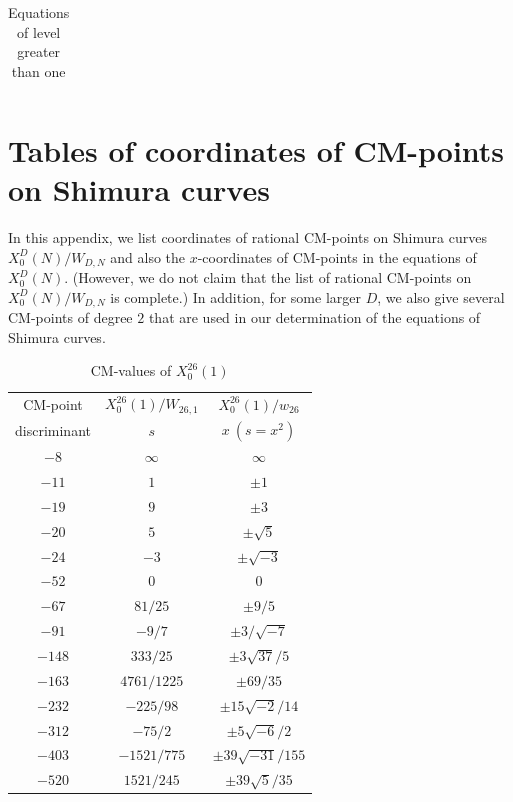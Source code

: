\documentclass{amsart}
\theoremstyle{definition}
\begin{document}
\begin{appendices}
\begin{table}[htb]
\begin{tabular}{|c|c|c|}
\end{tabular} 
\bigskip
\caption{Equations of level greater than one}
\end{table}

\section{Tables of coordinates of CM-points on Shimura curves}
In this appendix, we list coordinates of rational CM-points on Shimura
curves $X_0^D(N)/W_{D,N}$ and also the $x$-coordinates of CM-points in
the equations of $X_0^D(N)$. (However, we do not claim that the list
of rational CM-points on $X_0^D(N)/W_{D,N}$ is complete.) In addition,
for some larger $D$, we also give several CM-points of degree $2$ that
are used in our determination of the equations of Shimura curves.

\renewcommand{\arraystretch}{1.5}
\tabcolsep=10pt                         
\begin{table}[H]
\begin{tabular}{|c|c|c|}
\hline
CM-point& ${X_{0}^{26}(1)/W_{26,1}}$ & ${X_{0}^{26}(1)/w_{26}}$ \\
         discriminant & $s$ & $x\ (s=x^2)$ \\\hline
${-8}$ & $\infty$ & $\infty$  \\ 
${-11}$ & $1$ & $\pm 1$  \\ 
${-19}$ & $9$ & $\pm 3$  \\ 
${-20}$ & $5$ & $\pm \sqrt{5}$ \\
${-24}$ & $-3$ & $\pm \sqrt{-3}$  \\ 
${-52}$ & $0$ & $0$  \\
${-67}$ & $81/25$ & $\pm {9}/{5}$  \\ 
${-91}$ & $-9/7$ & $\pm {3/\sqrt{-7}}$  \\

${-148}$ & $333/25$ & $\pm {3\sqrt{37}}/{5}$  \\ 
${-163}$ & $4761/1225$ & $\pm {69}/{35}$  \\
${-232}$ & $-225/98$ & $\pm {15\sqrt{-2}}/{14}$  \\ 
${-312}$ & $-75/2$ & $\pm {5\sqrt{-6}}/{2}$ \\ 
${-403}$ & $-1521/775$ & $\pm {39\sqrt{-31}}/{155}$  \\ 
${-520}$ & $1521/245$ & $\pm39\sqrt{5}/35$\\ \hline
\end{tabular}
\caption{CM-values of $X^{26}_0(1)$}
\bigskip



\end{table}
\end{appendices}
\end{document}
